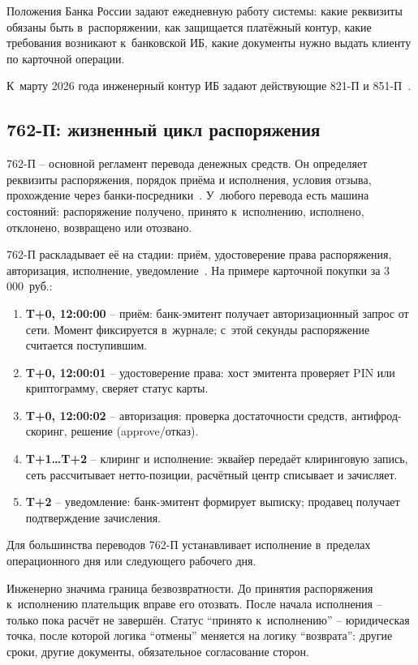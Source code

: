 Положения Банка России задают ежедневную работу системы: какие реквизиты обязаны быть в~распоряжении, как защищается платёжный контур, какие требования возникают к~банковской ИБ, какие документы нужно выдать клиенту по карточной операции.

К~марту 2026 года инженерный контур ИБ задают действующие 821-П и 851-П~\cite{cbr-821p,cbr-851p}.

\subsection*{762-П: жизненный цикл распоряжения}

762-П -- основной регламент перевода денежных средств. Он определяет реквизиты распоряжения, порядок приёма и исполнения, условия отзыва, прохождение через банки-посредники~\cite{cbr-762p}.
У~любого перевода есть машина состояний: распоряжение получено, принято к~исполнению, исполнено, отклонено, возвращено или отозвано.

762-П раскладывает её на стадии: приём, удостоверение права распоряжения, авторизация, исполнение, уведомление~\cite{cbr-762p}. На примере карточной покупки за 3\,000~руб.:

\begin{enumerate}
  \item \textbf{T+0, 12:00:00} -- приём: банк-эмитент получает
    авторизационный запрос от сети. Момент фиксируется
    в~журнале; с~этой секунды распоряжение считается поступившим.
  \item \textbf{T+0, 12:00:01} -- удостоверение права: хост
    эмитента проверяет PIN или криптограмму, сверяет статус карты.
  \item \textbf{T+0, 12:00:02} -- авторизация: проверка
    достаточности средств, антифрод-скоринг, решение
    (approve/отказ).
  \item \textbf{T+1\ldots T+2} -- клиринг и исполнение: эквайер
    передаёт клиринговую запись, сеть рассчитывает нетто-позиции,
    расчётный центр списывает и зачисляет.
  \item \textbf{T+2} -- уведомление: банк-эмитент формирует
    выписку; продавец получает подтверждение зачисления.
\end{enumerate}

Для большинства переводов 762-П устанавливает исполнение в~пределах операционного дня или следующего рабочего дня.

Инженерно значима граница безвозвратности. До принятия распоряжения к~исполнению плательщик вправе его отозвать. После начала исполнения -- только пока расчёт не завершён.
Статус \enquote{принято к~исполнению} -- юридическая точка, после которой логика \enquote{отмены} меняется на логику \enquote{возврата}: другие сроки, другие документы, обязательное согласование сторон.

